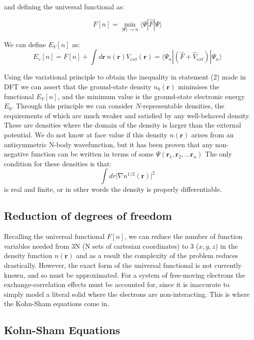 \documentclass[10pt]{article}
\begin{document}
and defining the universal functional as:

$$F[n] = \min_{|\Psi\rangle\rightarrow n}\langle\Psi|\hat{F}|\Psi\rangle$$

We can define $E_V[n]$ as:
\begin{equation}
	E_v[n] = F[n]+\int d\mathbf{r} \ n(\mathbf{r})V_{ext}(\mathbf{r}) = \langle\Psi_n|(\hat{F}+\hat{V}_{ext})|\Psi_n\rangle
\end{equation}

Using the variational principle to obtain the inequality in statement (2) made in DFT \cite{haynes} we can assert that the ground-state density $n_0(\mathbf{r})$ minimises the functional $E_V[n]$, and the minimum value is the ground-state electronic energy $E_0$. Through this principle we can consider $N$-representable densities, the requirements of which are much weaker and satisfied by any well-behaved density. These are densities where the domain of the density is larger than the external potential. We do not know at face value if this density $n(\mathbf{r})$ arises from an antisymmetric N-body wavefunction, but it has been proven that any non-negative function can be written in terms of some $\Psi(\mathbf{r}_1,\mathbf{r}_2,...\mathbf{r}_n)$ \cite{gilbert1975hohenberg} The only condition for these densities is that: $$\int dr \biggr|\nabla n^{1/2}(\mathbf{r})\biggr|^2$$ is real and finite, or in other words the density is properly differentiable.

\subsection{Reduction of degrees of freedom}

Recalling the universal functional $F[n]$, we can reduce the number of function variables needed from 3N (N sets of cartesian coordinates) to 3 ($x,y,z$) in the density function $n(\mathbf{r})$ and as a result the complexity of the problem reduces drastically. However, the exact form of the universal functional is not currently known, and so must be approximated. For a system of free-moving electrons the exchange-correlation effects must be accounted for, since it is inaccurate to simply model a literal solid where the electrons are non-interacting. This is where the Kohn-Sham equations come in.

\subsection{Kohn-Sham Equations}
\end{document}
